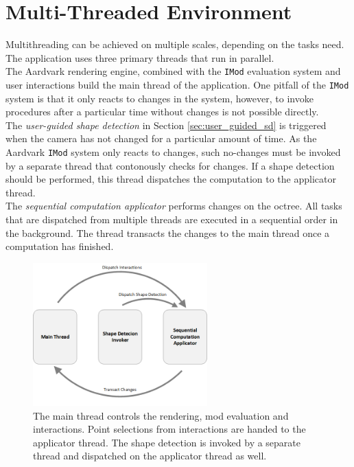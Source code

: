 \section{Multi-Threaded Environment}
\label {sec:multithreading}

Multithreading can be achieved on multiple scales, depending on the tasks need. The application uses three primary threads that run in parallel. 
\\
The Aardvark rendering engine, combined with the \verb|IMod| evaluation system and user interactions build the main thread of the application. One pitfall of the \verb|IMod| system is that it only reacts to changes in the system, however, to invoke procedures after a particular time without changes is not possible directly. 
\\


The \textit{user-guided shape detection} in Section \ref{sec:user_guided_sd} is triggered when the camera has not changed for a particular amount of time. As the Aardvark \verb|IMod| system only reacts to changes, such no-changes must be invoked by a separate thread that contonously checks for changes. If a shape detection should be performed, this thread dispatches the computation to the applicator thread.
\\
The \textit{sequential computation applicator} performs changes on the octree. All tasks that are dispatched from multiple threads are executed in a sequential order in the background. The thread transacts the changes to the main thread once a computation has finished. 

\begin{figure}
    \centering
    \includegraphics[width=0.6\textwidth]{Implementation/multiThreading.png}
    \caption{The main thread controls the rendering, mod evaluation and interactions. Point selections from interactions are handed to the applicator thread. The shape detection is invoked by a separate thread and dispatched on the applicator thread as well.  }
    \label{fig:multiThreading}
\end{figure}

